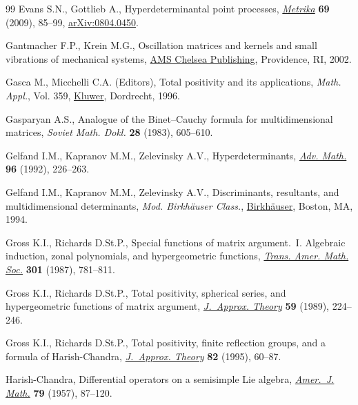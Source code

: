 \documentclass[pdftex]{sigma}
\numberwithin{equation}{section}
\begin{document}
\begin{thebibliography}{99}
Evans S.N., Gottlieb A., Hyperdeterminantal point processes,
 \href{https://doi.org/10.1007/s00184-008-0209-0}{\textit{Metrika}}
 \textbf{69} (2009), 85--99,
 \href{http://arxiv.org/abs/0804.0450}{arXiv:0804.0450}.

Gantmacher F.P., Krein M.G., Oscillation matrices and kernels and small
 vibrations of mechanical systems, \href{https://doi.org/10.1090/chel/345}{AMS
 Chelsea Publishing}, Providence, RI, 2002.

Gasca M., Micchelli C.A. (Editors), Total positivity and its applications,
 \textit{Math. Appl.}, Vol. 359,
 \href{https://doi.org/10.1007/978-94-015-8674-0}{Kluwer}, Dordrecht, 1996.

Gasparyan A.S., Analogue of the {B}inet--{C}auchy formula for multidimensional
 matrices, \textit{Soviet Math. Dokl.} \textbf{28} (1983), 605--610.

Gelfand I.M., Kapranov M.M., Zelevinsky A.V., Hyperdeterminants,
 \href{https://doi.org/10.1016/0001-8708(92)90056-Q}{\textit{Adv. Math.}}
 \textbf{96} (1992), 226--263.

Gelfand I.M., Kapranov M.M., Zelevinsky A.V., Discriminants, resultants, and
 multidimensional determinants, \textit{Mod. Birkh\"auser Class.},
 \href{https://doi.org/10.1007/978-0-8176-4771-1}{Birkh\"auser}, Boston, MA,
 1994.

Gross K.I., Richards D.St.P., Special functions of matrix argument.~{I}.
 {A}lgebraic induction, zonal polynomials, and hypergeometric functions,
 \href{https://doi.org/10.2307/2000670}{\textit{Trans. Amer. Math. Soc.}}
 \textbf{301} (1987), 781--811.

Gross K.I., Richards D.St.P., Total positivity, spherical series, and
 hypergeometric functions of matrix argument,
 \href{https://doi.org/10.1016/0021-9045(89)90153-6}{\textit{J.~Approx.
 Theory}} \textbf{59} (1989), 224--246.

Gross K.I., Richards D.St.P., Total positivity, finite reflection groups, and a
 formula of {H}arish-{C}handra,
 \href{https://doi.org/10.1006/jath.1995.1068}{\textit{J.~Approx. Theory}}
 \textbf{82} (1995), 60--87.

Harish-Chandra, Differential operators on a semisimple {L}ie algebra,
 \href{https://doi.org/10.2307/2372387}{\textit{Amer.~J. Math.}} \textbf{79}
 (1957), 87--120.


\end{thebibliography}
\end{document}
